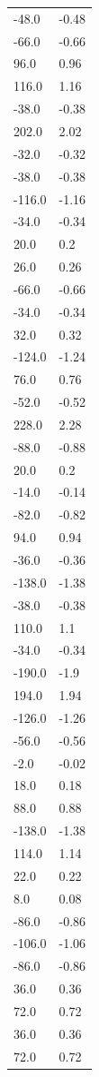 \begin{longtable}{ll}
-48.0 & -0.48 \\
-66.0 & -0.66 \\
96.0 & 0.96 \\
116.0 & 1.16 \\
-38.0 & -0.38 \\
202.0 & 2.02 \\
-32.0 & -0.32 \\
-38.0 & -0.38 \\
-116.0 & -1.16 \\
-34.0 & -0.34 \\
20.0 & 0.2 \\
26.0 & 0.26 \\
-66.0 & -0.66 \\
-34.0 & -0.34 \\
32.0 & 0.32 \\
-124.0 & -1.24 \\
76.0 & 0.76 \\
-52.0 & -0.52 \\
228.0 & 2.28 \\
-88.0 & -0.88 \\
20.0 & 0.2 \\
-14.0 & -0.14 \\
-82.0 & -0.82 \\
94.0 & 0.94 \\
-36.0 & -0.36 \\
-138.0 & -1.38 \\
-38.0 & -0.38 \\
110.0 & 1.1 \\
-34.0 & -0.34 \\
-190.0 & -1.9 \\
194.0 & 1.94 \\
-126.0 & -1.26 \\
-56.0 & -0.56 \\
-2.0 & -0.02 \\
18.0 & 0.18 \\
88.0 & 0.88 \\
-138.0 & -1.38 \\
114.0 & 1.14 \\
22.0 & 0.22 \\
8.0 & 0.08 \\
-86.0 & -0.86 \\
-106.0 & -1.06 \\
-86.0 & -0.86 \\
36.0 & 0.36 \\
72.0 & 0.72 \\
36.0 & 0.36 \\
72.0 & 0.72 \\

\end{longtable}
